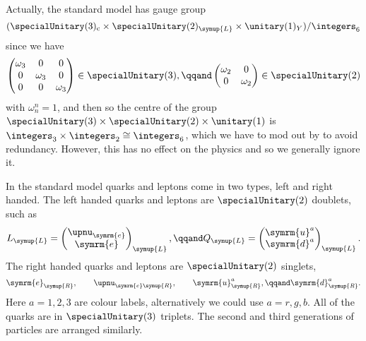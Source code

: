 \documentclass[fleqn]{NotesClass}
\newcommand{\Pparticle}[1]{\symrm{#1}}
\newcommand{\Pnue}{\ensuremath{\upnu_{\Pparticle{e}}}}
\newcommand{\Penominus}{\ensuremath{\Pparticle{e}}}
\newcommand{\Pup}{\ensuremath{\Pparticle{u}}}
\newcommand{\Pdown}{\ensuremath{\Pparticle{d}}}
\newcommand{\isomorphic}{\cong}
\newcommand{\Left}{\symup{L}}
\newcommand{\Right}{\symup{R}}
\begin{document}
    Actually, the standard model has gauge group
    \begin{equation}
        (\specialUnitary(3)_{\mathrm{c}} \times \specialUnitary(2)_{\Left} \times \unitary(1)_{Y})/\integers_6
    \end{equation}
    since we have
    \begin{equation}
        \begin{pmatrix}
            \omega_3 & 0 & 0\\
            0 & \omega_3 & 0\\
            0 & 0 & \omega_3
        \end{pmatrix}
        \in \specialUnitary(3), \qqand 
        \begin{pmatrix}
            \omega_2 & 0\\
            0 & \omega_2
        \end{pmatrix}
        \in \specialUnitary(2)
    \end{equation}
    with \(\omega_n^n = 1\), and then so the centre of the group \(\specialUnitary(3) \times \specialUnitary(2) \times \unitary(1)\) is \(\integers_3 \times \integers_2 \isomorphic \integers_6\), which we have to mod out by to avoid redundancy.
    However, this has no effect on the physics and so we generally ignore it.
    
    In the standard model quarks and leptons come in two types, left and right handed.
    The left handed quarks and leptons are \(\specialUnitary(2)\) doublets, such as
    \begin{equation}
        L_{\Left} = 
        \begin{pmatrix}
            \Pnue\\ \Penominus
        \end{pmatrix}
        _{\Left}, \qqand Q_{\Left} = 
        \begin{pmatrix}
            \Pup^a\\ \Pdown^a
        \end{pmatrix}
        _{\Left}.
    \end{equation}
    The right handed quarks and leptons are \(\specialUnitary(2)\) singlets,
    \begin{equation}
        \Penominus_{\Right}, \qquad \upnu_{\Penominus \Right}, \qquad \Pup_{\Right}^a, \qqand \Pdown_{\Right}^a.
    \end{equation}
    Here \(a = 1, 2, 3\) are colour labels, alternatively we could use \(a = r, g, b\).
    All of the quarks are in \(\specialUnitary(3)\) triplets.
    The second and third generations of particles are arranged similarly.
    
\end{document}
